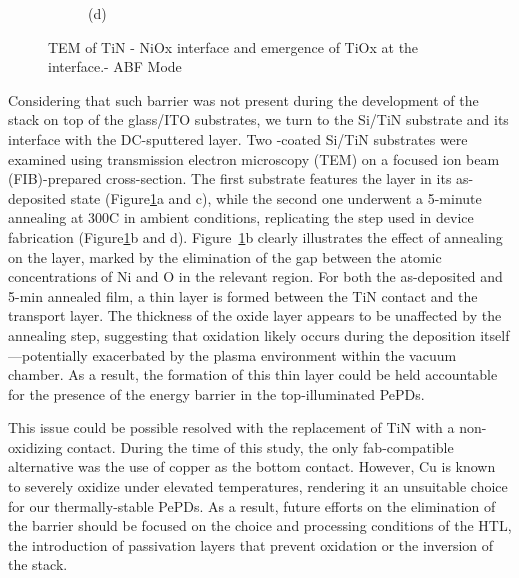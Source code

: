 \begin{figure}[htbp]
\begin{subfigure}[t]{0.35\textwidth}
        \caption*{(d)}
    \end{subfigure}
    \caption{TEM of TiN - NiOx interface and emergence of TiOx at the interface.- ABF Mode}
    \label{fig:pix_pepd:tem_on_nio}
\end{figure}

Considering that such barrier was not present during the development of the stack on top of the glass/ITO substrates, we turn to the Si/TiN substrate and its interface with the DC-sputtered  layer. Two -coated Si/TiN substrates were examined using transmission electron microscopy (TEM) on a focused ion beam (FIB)-prepared cross-section. The first substrate features the  layer in its as-deposited state (Figure\ref{fig:pix_pepd:tem_on_nio}a and c), while the second one underwent a 5-minute annealing at 300\degree C in ambient conditions, replicating the step used in device fabrication (Figure\ref{fig:pix_pepd:tem_on_nio}b and d). Figure~\ref{fig:pix_pepd:tem_on_nio}b clearly illustrates the effect of annealing on the  layer, marked by the elimination of the gap between the atomic concentrations of Ni and O in the relevant region. For both the as-deposited and 5-min annealed film, a thin  layer is formed between the TiN contact and the  transport layer. The thickness of the oxide layer appears to be unaffected by the annealing step, suggesting that oxidation likely occurs during the  deposition itself—potentially exacerbated by the plasma environment within the vacuum chamber. As a result, the formation of this thin  layer could be held accountable for the presence of the energy barrier in the top-illuminated PePDs. 

This issue could be possible resolved with the replacement of TiN with a non-oxidizing contact. During the time of this study, the only fab-compatible alternative was the use of copper as the bottom contact. However, Cu is known to severely oxidize under elevated temperatures, rendering it an unsuitable choice for our thermally-stable PePDs. As a result, future efforts on the elimination of the  barrier should be focused on the choice and processing conditions of the HTL, the introduction of passivation layers that prevent oxidation or the inversion of the stack. 



